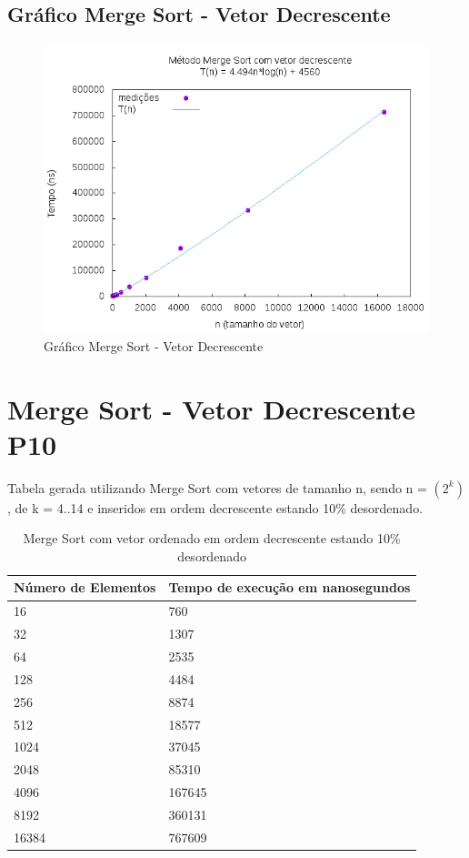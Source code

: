 \documentclass[12pt,a4paper,twoside]{report}
\begin{document}
\subsection{Gráfico Merge Sort - Vetor Decrescente}
\begin{figure}[H]
    \centering
    \includegraphics[width=0.7\linewidth]{graficos/MergeSort/vIntDecrescente/vIntDecrescente.png}
  \caption{Gráfico Merge Sort - Vetor Decrescente}
\end{figure}

\section{Merge Sort - Vetor Decrescente P10}
Tabela gerada utilizando Merge Sort com vetores de tamanho n, sendo n = $(2^k)$, de k = 4..14 e inseridos em ordem decrescente estando 10\% desordenado.
\begin{table}[H]
\centering
\caption{Merge Sort com vetor ordenado em ordem decrescente estando 10\% desordenado}
\label{my-label}
\begin{tabular}{|l|l|}
\hline
\multicolumn{1}{|c|}{\textbf{Número de Elementos}} & \multicolumn{1}{c|}{\textbf{Tempo de execução em nanosegundos}} \\ \hline
16 & 760 \\ \hline
32 & 1307 \\ \hline
64 & 2535 \\ \hline
128 & 4484 \\ \hline
256 & 8874 \\ \hline
512 & 18577 \\ \hline
1024 & 37045 \\ \hline
2048 & 85310 \\ \hline
4096 & 167645 \\ \hline
8192 & 360131 \\ \hline
16384 & 767609 \\ \hline
\end{tabular}
\end{table}
\end{document}
